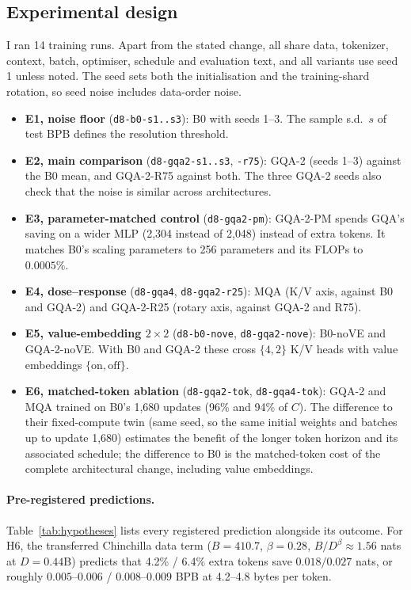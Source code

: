\documentclass[10pt,twocolumn]{article}
\begin{document}
\subsection{Experimental design}\label{sec:design}
I ran 14 training runs. Apart from the stated change, all share data, tokenizer, context, batch, optimiser, schedule and evaluation text, and all variants use seed 1 unless noted. The seed sets both the initialisation and the training-shard rotation,
so seed noise includes data-order noise.
\begin{itemize}
\item \textbf{E1, noise floor} (\texttt{d8-b0-s1..s3}): B0 with seeds 1--3. The sample s.d.\ $s$ of test BPB defines the resolution threshold.
\item \textbf{E2, main comparison} (\texttt{d8-gqa2-s1..s3}, \texttt{-r75}): GQA-2 (seeds 1--3) against the B0 mean, and GQA-2-R75 against both. The three GQA-2 seeds also check that
  the noise is similar across architectures.
\item \textbf{E3, parameter-matched control} (\texttt{d8-gqa2-pm}): GQA-2-PM spends GQA's saving on a wider MLP (2{,}304 instead of 2{,}048)
  instead of extra tokens. It matches B0's scaling parameters to 256 parameters and its FLOPs to $0.0005\%$.
\item \textbf{E4, dose--response} (\texttt{d8-gqa4}, \texttt{d8-gqa2-r25}): MQA (K/V axis, against B0 and GQA-2) and GQA-2-R25 (rotary axis, against GQA-2 and R75).
\item \textbf{E5, value-embedding $2\times2$} (\texttt{d8-b0-nove}, \texttt{d8-gqa2-nove}): B0-noVE and GQA-2-noVE. With B0 and GQA-2 these cross
  $\{4,2\}$ K/V heads with value embeddings $\{\text{on},\text{off}\}$.
\item \textbf{E6, matched-token ablation} (\texttt{d8-gqa2-tok}, \texttt{d8-gqa4-tok}): GQA-2 and MQA trained on B0's 1{,}680 updates (96\% and 94\% of $C$). The
  difference to their fixed-compute twin (same seed, so the same initial weights and batches up to update 1{,}680) estimates the benefit of the longer token horizon and its associated schedule; the difference to B0
  is the matched-token cost of the complete architectural change, including value embeddings.
\end{itemize}

\paragraph{Pre-registered predictions.}
Table~\ref{tab:hypotheses} lists every registered prediction alongside its outcome. For H6, the transferred
Chinchilla data term ($B=410.7$, $\beta=0.28$, $B/D^{\beta}\approx1.56$ nats at $D=0.44$B) predicts that
4.2\% / 6.4\% extra tokens save $0.018/0.027$ nats, or roughly $0.005$--$0.006$ / $0.008$--$0.009$ BPB
at 4.2--4.8 bytes per token.
\end{document}
